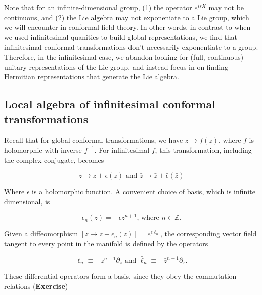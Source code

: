 \documentclass[10pt]{article}
\begin{document}
\noindent Note that for an infinite-dimensional group, (1) the operator $e^{isX}$ may not be continuous, and (2) the Lie algebra may not exponeniate to a Lie group, which we will encounter in conformal field theory. In other words, in contrast to when we used infinitesimal quanities to build global representations, we find that infinitesimal conformal transformations don't necessarily exponentiate to a group.\\

\noindent Therefore, in the infinitesimal case, we abandon looking for (full, continuous) unitary representations of the Lie group, and instead focus in on finding Hermitian representations that generate the Lie algebra. \\

\subsection*{Local algebra of infinitesimal conformal transformations}

\noindent Recall that for global conformal transformations, we have $z \rightarrow f(z)$, where $f$ is holomorphic with inverse $f^{-1}$. For infinitesimal $f$, this transformation, including the complex conjugate, becomes

\begin{equation}
z \rightarrow z + \epsilon (z) \text{ and } \bar{z} \rightarrow \bar{z} + \bar{\epsilon}(\bar{z})
\end{equation}

\noindent Where $\epsilon$ is a holomorphic function. A convenient choice of basis, which is infinite dimensional, is

\begin{equation}
\epsilon_n (z) = -\epsilon z^{n+1} \text{, where } n \in \mathbb{Z}.
\end{equation}

\noindent Given a diffeomorphism $[z \rightarrow z + \epsilon_n (z)] = e^{\epsilon \ell_n}$, the corresponding vector field tangent to every point in the manifold is defined by the operators

\begin{equation}
\ell_n \equiv - z^{n+1} \partial_z \text{ and } \bar{\ell}_n \equiv - \bar{z}^{n+1} \partial_{\bar{z}}.
\end{equation}

\noindent These differential operators form a basis, since they obey the commutation relations (\textbf{Exercise})
\end{document}
